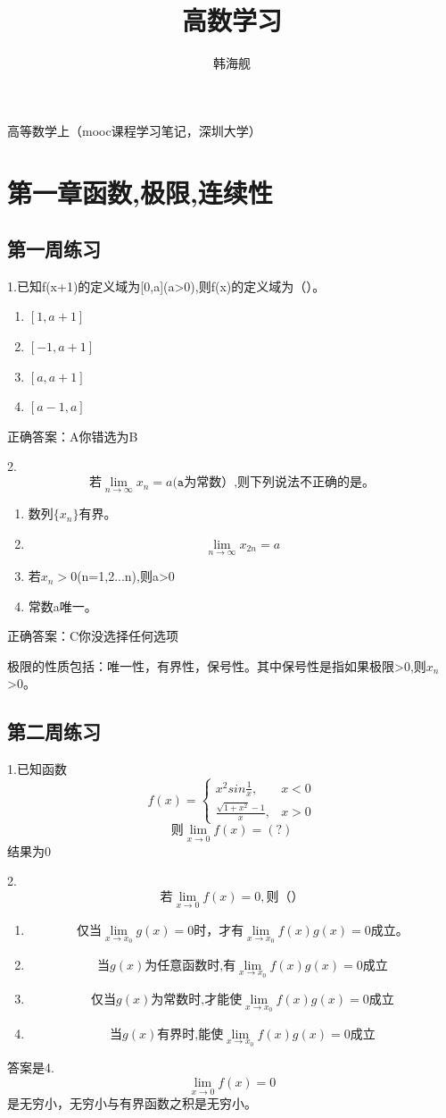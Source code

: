 \documentclass[fleqn]{article}
\begin{document}
\title{高数学习}
\author{韩海舰}
\maketitle
\setlength{\mathindent}{10pt}
\begin{flushleft}
高等数学上（mooc课程学习笔记，深圳大学）
\section{第一章\quad 函数,极限,连续性}
\subsection{第一周练习}
1.已知f(x+1)的定义域为[0,a](a>0),则f(x)的定义域为（）。
\begin{enumerate}
\item $[1,a+1]$
\item $[-1,a+1]$
\item $[a,a+1]$
\item $[a-1,a]$
\end{enumerate}

正确答案：A你错选为B

2. \[\texttt{若}\lim_{n\to \infty}x_n=a\texttt{(a为常数）,则下列说法不正确的是。}\]
\begin{enumerate}
\item 数列$\{x_n\}$有界。
\item \[\lim_{n\to \infty}x_{2n}=a\]
\item 若$x_n>0$(n=1,2...n),则a>0
\item 常数a唯一。
\end{enumerate}
正确答案：C你没选择任何选项

极限的性质包括：唯一性，有界性，保号性。其中保号性是指如果极限>0,则$x_n$>0。
\subsection{第二周练习}
\par
1.已知函数\[
f(x)=\left\{\begin{array}{ll}
x^2sin\frac{1}{x} ,& x<0 \\
\frac{\sqrt{1+x^2}-1}{x}, & x>0
\end{array}
\right. 
\]
\[\texttt{则}\lim_{x\to 0}f(x)=(?)
\]
结果为0
\par
2.\[
\texttt{若}\lim_{x\to 0}f(x)=0,\texttt{则（）}\]
\begin{enumerate}
\item \[\texttt{仅当}\lim_{x\to x_0}g(x)=0\texttt{时，才有}\lim_{x\to x_0}f(x)g(x)=0\texttt{成立。}\]
\item \[\texttt{当}g(x)\texttt{为任意函数时,有}\lim_{x\to x_0}f(x)g(x)=0\texttt{成立}\]
\item \[\texttt{仅当}g(x)\texttt{为常数时,才能使}\lim_{x\to x_0}f(x)g(x)=0\texttt{成立}\]
\item \[\texttt{当}g(x)\texttt{有界时,能使}\lim_{x\to x_0}f(x)g(x)=0\texttt{成立}\]
\end{enumerate}
答案是4.\[\lim_{x\to 0}f(x)=0\]是无穷小，无穷小与有界函数之积是无穷小。


\end{flushleft}
\end{document}
